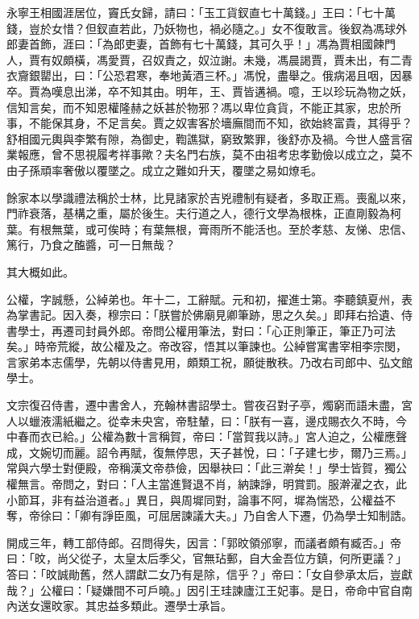 \begin{pinyinscope}
 永寧王相國涯居位，竇氏女歸，請曰：「玉工貨釵直七十萬錢。」王曰：「七十萬錢，豈於女惜？但釵直若此，乃妖物也，禍必隨之。」女不復敢言。後釵為馮球外郎妻首飾，涯曰：「為郎吏妻，首飾有七十萬錢，其可久乎！」馮為賈相國餗門人，賈有奴頗橫，馮愛賈，召奴責之，奴泣謝。未幾，馮晨謁賈，賈未出，有二青衣齎銀罌出，曰：「公恐君寒，奉地黃酒三杯。」馮悅，盡舉之。俄病渴且咽，因暴卒。賈為嘆息出涕，卒不知其由。明年，王、賈皆遘禍。噫，王以珍玩為物之妖，信知言矣，而不知恩權隆赫之妖甚於物邪？馮以卑位貪貨，不能正其家，忠於所事，不能保其身，不足言矣。賈之奴害客於墻廡間而不知，欲始終富貴，其得乎？舒相國元輿與李繁有隙，為御史，鞫譙獄，窮致繁罪，後舒亦及禍。今世人盛言宿業報應，曾不思視履考祥事歟？夫名門右族，莫不由祖考忠孝勤儉以成立之，莫不由子孫頑率奢傲以覆墜之。成立之難如升天，覆墜之易如燎毛。



 餘家本以學識禮法稱於士林，比見諸家於吉兇禮制有疑者，多取正焉。喪亂以來，門祚衰落，基構之重，屬於後生。夫行道之人，德行文學為根株，正直剛毅為柯葉。有根無葉，或可俟時；有葉無根，膏雨所不能活也。至於孝慈、友悌、忠信、篤行，乃食之醢醬，可一日無哉？



 其大概如此。



 公權，字誠懸，公綽弟也。年十二，工辭賦。元和初，擢進士第。李聽鎮夏州，表為掌書記。因入奏，穆宗曰：「朕嘗於佛廟見卿筆跡，思之久矣。」即拜右拾遺、侍書學士，再遷司封員外郎。帝問公權用筆法，對曰：「心正則筆正，筆正乃可法矣。」時帝荒縱，故公權及之。帝改容，悟其以筆諫也。公綽嘗寓書宰相李宗閔，言家弟本志儒學，先朝以侍書見用，頗類工祝，願徙散秩。乃改右司郎中、弘文館學士。



 文宗復召侍書，遷中書舍人，充翰林書詔學士。嘗夜召對子亭，燭窮而語未盡，宮人以蠟液濡紙繼之。從幸未央宮，帝駐輦，曰：「朕有一喜，邊戍賜衣久不時，今中春而衣已給。」公權為數十言稱賀，帝曰：「當賀我以詩。」宮人迫之，公權應聲成，文婉切而麗。詔令再賦，復無停思，天子甚悅，曰：「子建七步，爾乃三焉。」常與六學士對便殿，帝稱漢文帝恭儉，因舉袂曰：「此三澣矣！」學士皆賀，獨公權無言。帝問之，對曰：「人主當進賢退不肖，納諫諍，明賞罰。服澣濯之衣，此小節耳，非有益治道者。」異日，與周墀同對，論事不阿，墀為惴恐，公權益不奪，帝徐曰：「卿有諍臣風，可屈居諫議大夫。」乃自舍人下遷，仍為學士知制誥。



 開成三年，轉工部侍郎。召問得失，因言：「郭旼領邠寧，而議者頗有臧否。」帝曰：「旼，尚父從子，太皇太后季父，官無玷郵，自大金吾位方鎮，何所更議？」答曰：「旼誠勛舊，然人謂獻二女乃有是除，信乎？」帝曰：「女自參承太后，豈獻哉？」公權曰：「疑嫌間不可戶曉。」因引王珪諫廬江王妃事。是日，帝命中官自南內送女還旼家。其忠益多類此。遷學士承旨。




\end{pinyinscope}
